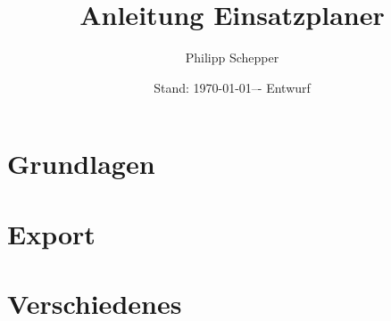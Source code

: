 \documentclass[a4paper,ngerman,oneside]{scrbook}
\title{Anleitung Einsatzplaner}
\author{Philipp Schepper}
\date{Stand: \today –- Entwurf}
\begin{document}
\maketitle

\frontmatter
\tableofcontents


\mainmatter
\part{Grundlagen}





\part{Export}


\part{Verschiedenes}



\appendix



\backmatter

\end{document}

